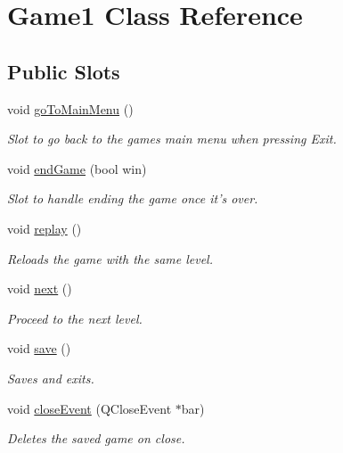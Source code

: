 \hypertarget{classGame1}{\section{\-Game1 \-Class \-Reference}
\label{classGame1}
}
\subsection*{\-Public \-Slots}
\begin{DoxyCompactItemize}
\item 
void \hyperlink{classGame1_ad2deb82e0e796476d4e872b35b18298a}{go\-To\-Main\-Menu} ()
\begin{DoxyCompactList}\small\item\em \-Slot to go back to the games main menu when pressing \-Exit. \end{DoxyCompactList}\item 
void \hyperlink{classGame1_a77d143d518941d661ed7ed58d7709eb3}{end\-Game} (bool win)
\begin{DoxyCompactList}\small\item\em \-Slot to handle ending the game once it's over. \end{DoxyCompactList}\item 
void \hyperlink{classGame1_ae77aa2b2516135ecaa1667c8d3edc7c4}{replay} ()
\begin{DoxyCompactList}\small\item\em \-Reloads the game with the same level. \end{DoxyCompactList}\item 
void \hyperlink{classGame1_a556cb1f167454f0b668b706da20d403f}{next} ()
\begin{DoxyCompactList}\small\item\em \-Proceed to the next level. \end{DoxyCompactList}\item 
void \hyperlink{classGame1_a1104aaaccf868b6726c42779af376bd1}{save} ()
\begin{DoxyCompactList}\small\item\em \-Saves and exits. \end{DoxyCompactList}\item 
void \hyperlink{classGame1_aa3a44255c2437ca14fe1d9ac4e64b6c1}{close\-Event} (\-Q\-Close\-Event $\ast$bar)
\begin{DoxyCompactList}\small\item\em \-Deletes the saved game on close. \end{DoxyCompactList}\end{DoxyCompactItemize}
